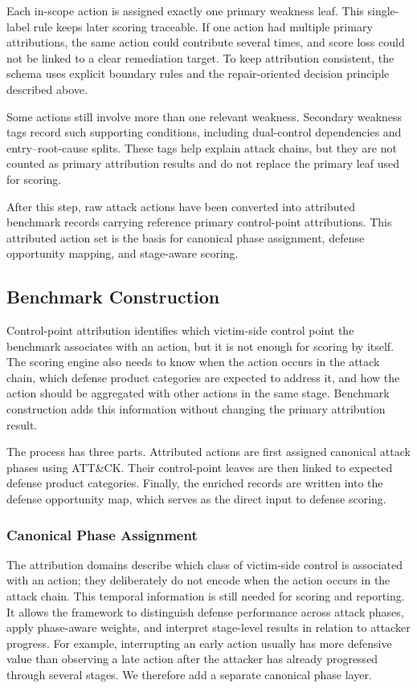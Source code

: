 Each in-scope action is assigned exactly one primary weakness leaf. This single-label rule keeps later scoring traceable. If one action had multiple primary attributions, the same action could contribute several times, and score loss could not be linked to a clear remediation target. To keep attribution consistent, the schema uses explicit boundary rules and the repair-oriented decision principle described above.

Some actions still involve more than one relevant weakness. Secondary weakness tags record such supporting conditions, including dual-control dependencies and entry--root-cause splits. These tags help explain attack chains, but they are not counted as primary attribution results and do not replace the primary leaf used for scoring.

After this step, raw attack actions have been converted into attributed benchmark records carrying reference primary control-point attributions. This attributed action set is the basis for canonical phase assignment, defense opportunity mapping, and stage-aware scoring.

\subsection{Benchmark Construction}
\label{subsec:benchmark-construction}

Control-point attribution identifies which victim-side control point the benchmark associates with an action, but it is not enough for scoring by itself. The scoring engine also needs to know when the action occurs in the attack chain, which defense product categories are expected to address it, and how the action should be aggregated with other actions in the same stage. Benchmark construction adds this information without changing the primary attribution result.

The process has three parts. Attributed actions are first assigned canonical attack phases using ATT\&CK. Their control-point leaves are then linked to expected defense product categories. Finally, the enriched records are written into the defense opportunity map, which serves as the direct input to defense scoring.

\subsubsection{Canonical Phase Assignment}

The attribution domains describe which class of victim-side control is associated with an action; they deliberately do not encode when the action occurs in the attack chain. This temporal information is still needed for scoring and reporting. It allows the framework to distinguish defense performance across attack phases, apply phase-aware weights, and interpret stage-level results in relation to attacker progress. For example, interrupting an early action usually has more defensive value than observing a late action after the attacker has already progressed through several stages. We therefore add a separate canonical phase layer.

